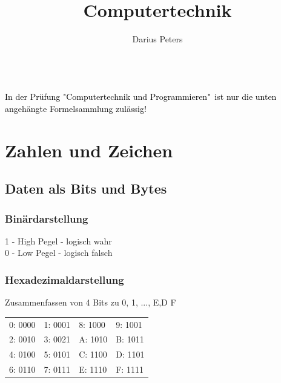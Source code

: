 \documentclass[german, threecolumn, 8pt]{latex4ei/latex4ei_sheet}
\title{Computertechnik}
\author{Darius Peters}                    %
\begin{document}
\ifdefined\GitRevision{}\fi

\maketitle   %
\\
\textcolor{black}{\small In der Prüfung "Computertechnik und Programmieren"\ ist nur die unten angehängte Formelsammlung zulässig!}
\section{Zahlen und Zeichen}
    \subsection{Daten als Bits und Bytes}
	\subsubsection{Binärdarstellung}
	1 - High Pegel - logisch wahr\\
	0 - Low Pegel - logisch falsch
	\subsubsection{Hexadezimaldarstellung}
	Zusammenfassen von 4 Bits zu 0, 1, ..., E,D F\\
	\begin{tabular}{l|l||l|l}
	0: 0000 & 1: 0001 & 8: 1000 & 9: 1001\\
	2: 0010 & 3: 0021 & A: 1010 & B: 1011\\
	4: 0100 & 5: 0101 & C: 1100 & D: 1101\\
	6: 0110 & 7: 0111 & E: 1110 & F: 1111\\
	\end{tabular}
\end{document}
